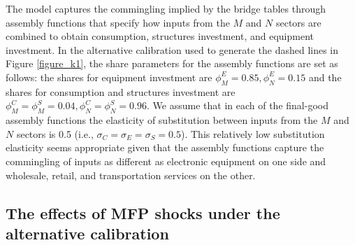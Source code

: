 \documentclass[12pt,fleqn]{article}
\begin{document}
\begin{enumerate}
{\normalsize The model captures the commingling implied by the bridge tables
through assembly functions that specify how inputs from the $M$ and $N$
sectors are combined to obtain consumption, structures investment, and
equipment investment. In the alternative calibration used to generate the
dashed lines in Figure \ref{figure_k1}, the share parameters for the
assembly functions are set as follows: the shares for equipment investment
are $\phi _{M}^{E}=0.85,\phi _{N}^{E}=0.15$ and the shares for consumption
and structures investment are $\phi _{M}^{C}=\phi _{M}^{S}=0.04,\phi
_{N}^{C}=\phi_N^S=0.96.$ We assume that in each of the final-good assembly
functions the elasticity of substitution between inputs from the $M$ and $N$
sectors is 0.5 (i.e., $\sigma _{C}=\sigma _{E}=\sigma _{S}= 0.5$). This
relatively low substitution elasticity seems appropriate given that the
assembly functions capture the commingling of inputs as different as
electronic equipment on one side and wholesale, retail, and transportation
services on the other. }
\end{enumerate}

\subsection{\protect\normalsize The effects of MFP shocks under the
alternative calibration}

{\normalsize %
}
\end{document}
